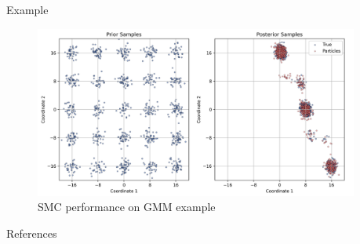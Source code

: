 \documentclass[final]{beamer}
\newlength{\sepwidth}
\newlength{\colwidth}
\newcommand{\separatorcolumn}{\begin{column}{\sepwidth}\end{column}}
\begin{document}
\begin{frame}[t]
\begin{columns}[t]
\begin{column}{\colwidth}
\begin{exampleblock}{Example}
        \begin{figure}[htbp]
            \centering
            \includegraphics[width=0.95\colwidth]{poster/assets/samples.png}
            \caption{SMC performance on GMM example}
            \label{fig:example}
        \end{figure}
    \end{exampleblock}

    \begin{block}{References}
        \printbibliography
    \end{block}

\end{column}

\separatorcolumn
\end{columns}
\end{frame}
\end{document}
